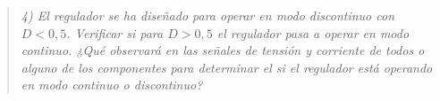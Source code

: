 \begin{quote} \textit{ 4) El regulador se ha diseñado para operar en modo discontinuo con $D<0,5$. Verificar si para $D>0,5$ el regulador pasa a operar en modo continuo. ¿Qué observará en las señales de tensión y corriente de todos o alguno de los componentes para determinar el si el regulador está operando en modo continuo o discontinuo?}
\end{quote}

